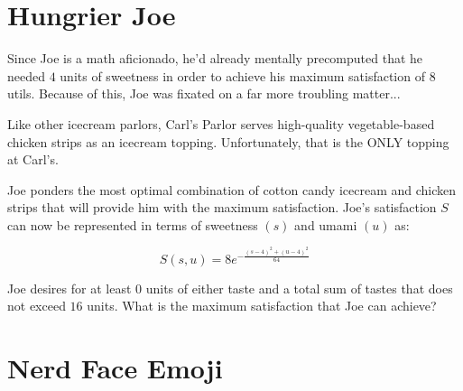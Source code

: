 
\setcounter{chapter}{2}
\chapter{Hungrier Joe}
Since Joe is a math aficionado, he'd already mentally precomputed that he needed $4$ units of sweetness in order to achieve his maximum satisfaction of $8$ utils.
Because of this, Joe was fixated on a far more troubling matter...

Like other icecream parlors, Carl's Parlor serves high-quality vegetable-based chicken strips as an icecream topping.
Unfortunately, that is the ONLY topping at Carl's.

Joe ponders the most optimal combination of cotton candy icecream and chicken strips that will provide him with the maximum satisfaction.
Joe's satisfaction $S$ can now be represented in terms of sweetness $(s)$ and umami $(u)$ as:\par
\Large
\begin{equation}
	S(s, u) = 8e^{-\frac{(s-4)^2+(u-4)^2}{64}}
\end{equation}
\normalsize
\begin{eg}
	Joe desires for at least $0$ units of either taste and a total sum of tastes that does not exceed $16$ units. What is the maximum satisfaction that Joe can achieve?
\end{eg}

\setcounter{chapter}{3}
\chapter{Nerd Face Emoji} %
